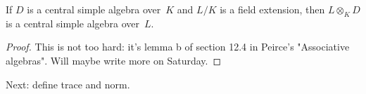 \begin{lemma}
    \label{IsCentralSimple.baseChange} %
    If $D$ is a central simple algebra over~$K$ and $L/K$ is a field extension, then $L\otimes_KD$
    is a central simple algebra over~$L$.
\end{lemma}
\begin{proof}
    This is not too hard: it's lemma b of section 12.4 in Peirce's "Associative algebras".
    Will maybe write more on Saturday.
\end{proof}


Next: define trace and norm.


